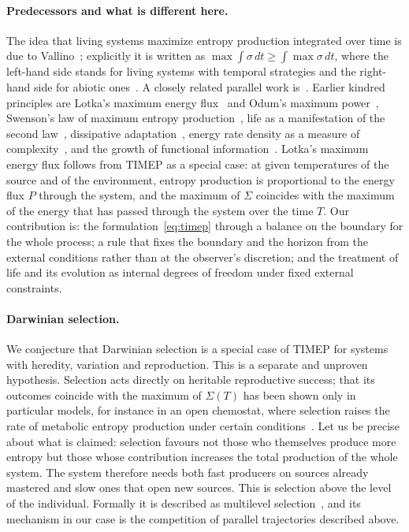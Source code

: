\documentclass[11pt,a4paper]{article}
\begin{document}
\paragraph{Predecessors and what is different here.}
The idea that living systems maximize entropy production integrated over time is due to Vallino~\cite{vallino2010}; explicitly it is written as $\max\!\int\!\sigma\,dt\ge\int\!\max\sigma\,dt$, where the left-hand side stands for living systems with temporal strategies and the right-hand side for abiotic ones~\cite{vallino2020}. A closely related parallel work is~\cite{newbury2026}. Earlier kindred principles are Lotka's maximum energy flux~\cite{lotka1922} and Odum's maximum power~\cite{odum1988}, Swenson's law of maximum entropy production~\cite{swenson1989}, life as a manifestation of the second law~\cite{schneider1994}, dissipative adaptation~\cite{england2013,england2015}, energy rate density as a measure of complexity~\cite{chaisson2011}, and the growth of functional information~\cite{wong2023}. Lotka's maximum energy flux follows from TIMEP as a special case: at given temperatures of the source and of the environment, entropy production is proportional to the energy flux $P$ through the system, and the maximum of $\Sigma$ coincides with the maximum of the energy that has passed through the system over the time $T$. Our contribution is: the formulation~\eqref{eq:timep} through a balance on the boundary for the whole process; a rule that fixes the boundary and the horizon from the external conditions rather than at the observer's discretion; and the treatment of life and its evolution as internal degrees of freedom under fixed external constraints.

\paragraph{Darwinian selection.}
We conjecture that Darwinian selection is a special case of TIMEP for systems with heredity, variation and reproduction. This is a separate and unproven hypothesis. Selection acts directly on heritable reproductive success; that its outcomes coincide with the maximum of $\Sigma(T)$ has been shown only in particular models, for instance in an open chemostat, where selection raises the rate of metabolic entropy production under certain conditions~\cite{degioia2026}. Let us be precise about what is claimed: selection favours not those who themselves produce more entropy but those whose contribution increases the total production of the whole system. The system therefore needs both fast producers on sources already mastered and slow ones that open new sources. This is selection above the level of the individual. Formally it is described as multilevel selection~\cite{price1970,price1972}, and its mechanism in our case is the competition of parallel trajectories described above.
\end{document}
